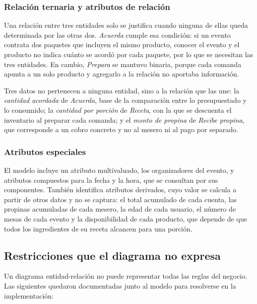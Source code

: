 \subsubsection{Relación ternaria y atributos de relación}

Una relación entre tres entidades solo se justifica cuando ninguna de ellas queda determinada por las otras dos. \textit{Acuerda} cumple esa condición: si un evento contrata dos paquetes que incluyen el mismo producto, conocer el evento y el producto no indica cuánto se acordó por cada paquete, por lo que se necesitan las tres entidades. En cambio, \textit{Prepara} se mantuvo binaria, porque cada comanda apunta a un solo producto y agregarlo a la relación no aportaba información.

Tres datos no pertenecen a ninguna entidad, sino a la relación que las une: la \textit{cantidad acordada} de \textit{Acuerda}, base de la comparación entre lo presupuestado y lo consumido; la \textit{cantidad por porción} de \textit{Receta}, con la que se descuenta el inventario al preparar cada comanda; y el \textit{monto de propina} de \textit{Recibe propina}, que corresponde a un cobro concreto y no al mesero ni al pago por separado.

\subsubsection{Atributos especiales}

El modelo incluye un atributo multivaluado, los organizadores del evento, y atributos compuestos para la fecha y la hora, que se consultan por sus componentes. También identifica atributos derivados, cuyo valor se calcula a partir de otros datos y no se captura: el total acumulado de cada cuenta, las propinas acumuladas de cada mesero, la edad de cada usuario, el número de mesas de cada evento y la disponibilidad de cada producto, que depende de que todos los ingredientes de su receta alcancen para una porción.

\subsection{Restricciones que el diagrama no expresa}

Un diagrama entidad-relación no puede representar todas las reglas del negocio. Las siguientes quedaron documentadas junto al modelo para resolverse en la implementación:

